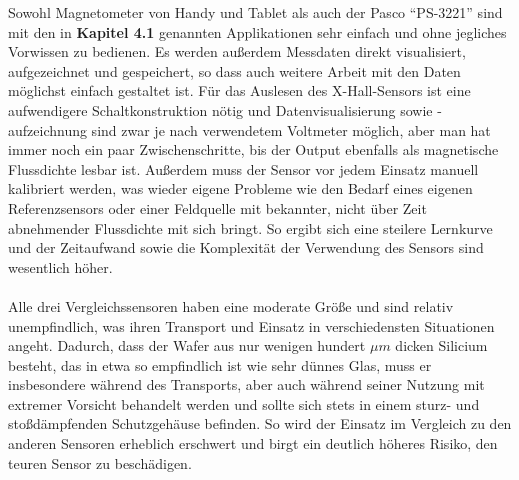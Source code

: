 \documentclass[12pt, a4paper]{article}
\begin{document}
Sowohl Magnetometer von Handy und Tablet als auch der Pasco ``PS-3221'' sind mit den in \textbf{Kapitel 4.1} genannten Applikationen sehr einfach und ohne jegliches Vorwissen zu bedienen. Es werden außerdem Messdaten direkt visualisiert, aufgezeichnet und gespeichert, so dass auch weitere Arbeit mit den Daten möglichst einfach gestaltet ist.\newline
Für das Auslesen des X-Hall-Sensors ist eine aufwendigere Schaltkonstruktion nötig und Datenvisualisierung sowie -aufzeichnung sind zwar je nach verwendetem Voltmeter möglich, aber man hat immer noch ein paar Zwischenschritte, bis der Output ebenfalls als magnetische Flussdichte lesbar ist. Außerdem muss der Sensor vor jedem Einsatz manuell kalibriert werden, was wieder eigene Probleme wie den Bedarf eines eigenen Referenzsensors oder einer Feldquelle mit bekannter, nicht über Zeit abnehmender Flussdichte mit sich bringt. So ergibt sich eine steilere Lernkurve und der Zeitaufwand sowie die Komplexität der Verwendung des Sensors sind wesentlich höher.\paragraph{}

Alle drei Vergleichssensoren haben eine moderate Größe und sind relativ unempfindlich, was ihren Transport und Einsatz in verschiedensten Situationen angeht.\newline
Dadurch, dass der Wafer aus nur wenigen hundert $\mu{m}$ dicken Silicium besteht, das in etwa so empfindlich ist wie sehr dünnes Glas, muss er insbesondere während des Transports, aber auch während seiner Nutzung mit extremer Vorsicht behandelt werden und sollte sich stets in einem sturz- und stoßdämpfenden Schutzgehäuse befinden. So wird der Einsatz im Vergleich zu den anderen Sensoren erheblich erschwert und birgt ein deutlich höheres Risiko, den teuren Sensor zu beschädigen.\paragraph{}
\end{document}
